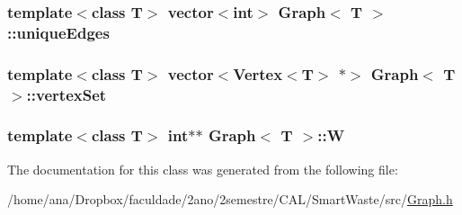 \subsubsection[{\texorpdfstring{unique\+Edges}{uniqueEdges}}]{\setlength{\rightskip}{0pt plus 5cm}template$<$class T$>$ vector$<$int$>$ {\bf Graph}$<$ T $>$\+::unique\+Edges\hspace{0.3cm}{\ttfamily [private]}}\hypertarget{classGraph_a6f829bb651ea6c0b2aa45564dd4eda25}{}\label{classGraph_a6f829bb651ea6c0b2aa45564dd4eda25}
\subsubsection[{\texorpdfstring{vertex\+Set}{vertexSet}}]{\setlength{\rightskip}{0pt plus 5cm}template$<$class T$>$ vector$<${\bf Vertex}$<$T$>$ $\ast$$>$ {\bf Graph}$<$ T $>$\+::vertex\+Set\hspace{0.3cm}{\ttfamily [private]}}\hypertarget{classGraph_a73d4e735fc0a7c83c9c689a2b53fa623}{}\label{classGraph_a73d4e735fc0a7c83c9c689a2b53fa623}
\subsubsection[{\texorpdfstring{W}{W}}]{\setlength{\rightskip}{0pt plus 5cm}template$<$class T$>$ int$\ast$$\ast$ {\bf Graph}$<$ T $>$\+::W\hspace{0.3cm}{\ttfamily [private]}}\hypertarget{classGraph_a20edce9af2c8ea8725ccbb5201eace38}{}\label{classGraph_a20edce9af2c8ea8725ccbb5201eace38}


The documentation for this class was generated from the following file\+:\begin{DoxyCompactItemize}
\item 
/home/ana/\+Dropbox/faculdade/2ano/2semestre/\+C\+A\+L/\+Smart\+Waste/src/\hyperlink{Graph_8h}{Graph.\+h}\end{DoxyCompactItemize}
